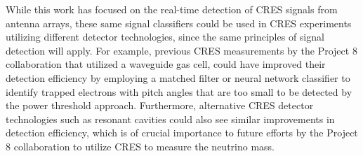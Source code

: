 While this work has focused on the real-time detection of CRES signals from antenna arrays, these same signal classifiers could be used in CRES experiments utilizing different detector technologies, since the same principles of signal detection will apply. For example, previous CRES measurements by the Project 8 collaboration that utilized a waveguide gas cell, could have improved their detection efficiency by employing a matched filter or neural network classifier to identify trapped electrons with pitch angles that are too small to be detected by the power threshold approach. Furthermore, alternative CRES detector technologies such as resonant cavities \cite{p8snowmass2022} could also see similar improvements in detection efficiency, which is of crucial importance to future efforts by the Project 8 collaboration to utilize CRES to measure the neutrino mass.

